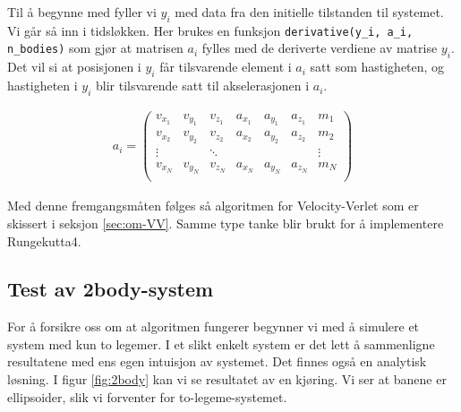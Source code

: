 \documentclass[11pt]{article}
\begin{document}
\begin{multicols}{2}
Til å begynne med fyller vi $y_i$ med data fra den initielle tilstanden til systemet.
Vi går så inn i tidsløkken. Her brukes en funksjon
\texttt{derivative(y\_i, a\_i, n\_bodies)} som gjør at matrisen $a_i$ fylles med de
deriverte verdiene av matrise $y_i$. Det vil si at posisjonen i $y_i$
får tilsvarende element i $a_i$ satt som hastigheten, og hastigheten i
$y_i$ blir tilsvarende satt til akselerasjonen i $a_i$. 

\begin{align*}
  a_i = \begin{pmatrix}
    v_{x_1}&v_{y_1} &v_{z_1}&a_{x_1}&a_{y_1} &a_{z_1} & m_1\\
    v_{x_2}&v_{y_2} &v_{z_2}&a_{x_2}&a_{y_2} &a_{z_2} & m_2\\
    \vdots&&\ddots&&&&\vdots\\
    v_{x_N}&v_{y_N} &v_{z_N}&a_{x_N}&a_{y_N} &a_{z_N} & m_N\\
  \end{pmatrix}
\end{align*}

Med denne fremgangsmåten følges så algoritmen for Velocity-Verlet som
er skissert i seksjon \ref{sec:om-VV}. Samme type tanke blir brukt for
å implementere Rungekutta4.


\subsection{Test av 2body-system}
For å forsikre oss om at algoritmen fungerer begynner vi med å simulere
et system med kun to legemer. I et slikt enkelt system er det lett å 
sammenligne resultatene med ens egen intuisjon av systemet. Det finnes
også en analytisk løsning. I figur \ref{fig:2body} kan vi se resultatet 
av en kjøring. Vi ser at banene er ellipsoider, slik vi forventer for
to-legeme-systemet. 

\end{multicols}
\end{document}
